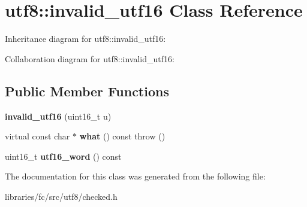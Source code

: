 \hypertarget{classutf8_1_1invalid__utf16}{}\section{utf8\+:\+:invalid\+\_\+utf16 Class Reference}
\label{classutf8_1_1invalid__utf16}


Inheritance diagram for utf8\+:\+:invalid\+\_\+utf16\+:


Collaboration diagram for utf8\+:\+:invalid\+\_\+utf16\+:
\subsection*{Public Member Functions}
\begin{DoxyCompactItemize}
\item 
\mbox{\label{classutf8_1_1invalid__utf16_a83f8d198986495279499cfba0f44f9e5}} 
{\bfseries invalid\+\_\+utf16} (uint16\+\_\+t u)
\item 
\mbox{\label{classutf8_1_1invalid__utf16_a1ed788f5959f07d7b508152d0d2e6785}} 
virtual const char $\ast$ {\bfseries what} () const  throw ()
\item 
\mbox{\label{classutf8_1_1invalid__utf16_a4b25bbdaeed94ff863c2780a5e4e8f62}} 
uint16\+\_\+t {\bfseries utf16\+\_\+word} () const
\end{DoxyCompactItemize}


The documentation for this class was generated from the following file\+:\begin{DoxyCompactItemize}
\item 
libraries/fc/src/utf8/checked.\+h\end{DoxyCompactItemize}

